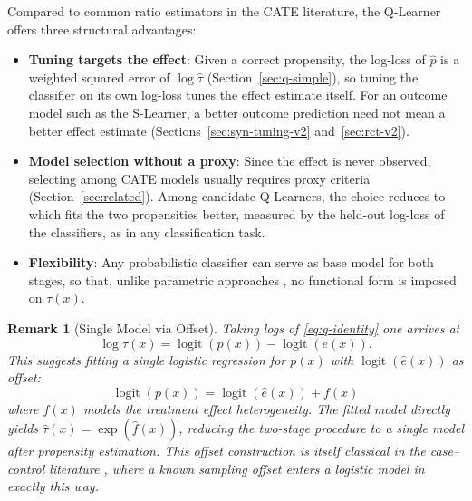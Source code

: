 \documentclass{article}
\newtheorem{remark}{Remark}
\newcommand{\logit}{\operatorname{logit}}
\begin{document}
Compared to common ratio estimators in the CATE literature, the Q-Learner offers three structural advantages:
\begin{itemize}
    \item \textbf{Tuning targets the effect}: Given a correct propensity, the log-loss of $\hat{p}$ is a
    weighted squared error of $\log\hat{\tau}$ (Section~\ref{sec:q-simple}),
    so tuning the classifier on its own log-loss tunes the effect estimate
    itself. For an
    outcome model such as the S-Learner, a better outcome prediction need not
    mean a better effect estimate
    (Sections~\ref{sec:syn-tuning-v2} and~\ref{sec:rct-v2}).
    \item \textbf{Model selection without a proxy}: Since the effect is
    never observed, selecting among CATE models usually requires proxy
    criteria (Section~\ref{sec:related}). Among candidate Q-Learners, the
    choice reduces to which fits the two propensities better, measured by
    the held-out log-loss of the classifiers, as in any classification task.
    \item \textbf{Flexibility}: Any probabilistic classifier can serve as
    base model for both stages, so that, unlike parametric approaches
    \citep{yadlowsky2021ratio, zou2004modified}, no functional form is
    imposed on $\tau(x)$.
\end{itemize}

\begin{remark}[Single Model via Offset]
\label{rem:single-model}
Taking logs of \eqref{eq:q-identity} one arrives at
\begin{equation}
    \log\tau(x) = \logit(p(x)) - \logit(e(x)).
\end{equation}
This suggests fitting a single logistic regression for $p(x)$ with
$\logit(\hat{e}(x))$ as offset:
\begin{equation}
\logit(p(x)) = \logit(\hat{e}(x)) + f(x)
\end{equation}
where $f(x)$ models the treatment effect heterogeneity. The fitted model
directly yields $\hat{\tau}(x) = \exp(\hat{f}(x))$, reducing the
two-stage procedure to a single model after propensity estimation.
This offset construction is itself classical in the case--control
literature \citep{prentice1979}, where a known sampling offset enters
a logistic model in exactly this way.
\end{remark}
\end{document}
